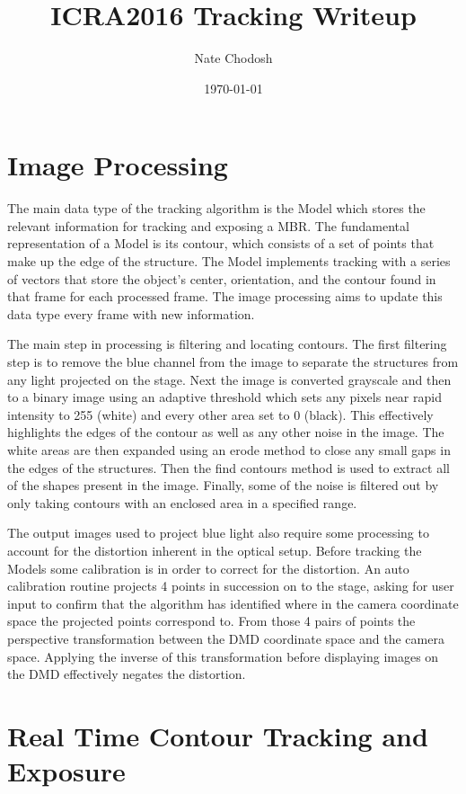 \documentclass[11pt]{article}
\author{Nate Chodosh}
\date{\today}
\title{ICRA2016 Tracking Writeup}
\begin{document}
\maketitle

\section{Image Processing}
\label{sec-1}


The main data type of the tracking algorithm is the Model which stores
the relevant information for tracking and exposing a MBR. The
fundamental representation of a Model is its contour, which consists
of a set of points that make up the edge of the structure. The Model
implements tracking with a series of vectors that store the object's
center, orientation, and the contour found in that frame for each
processed frame. The image processing aims to update this data type
every frame with new information.

The main step in processing is filtering and locating contours. The
first filtering step is to remove the blue channel from the image to
separate the structures from any light projected on the stage. Next
the image is converted grayscale and then to a binary image using an
adaptive threshold which sets any pixels near rapid intensity to 255
(white) and every other area set to 0 (black). This effectively
highlights the edges of the contour as well as any other noise in the
image. The white areas are then expanded using an erode method to
close any small gaps in the edges of the structures. Then the find
contours method is used to extract all of the shapes present in the
image. Finally, some of the noise is filtered out by only taking
contours with an enclosed area in a specified range.

The output images used to project blue light also require some
processing to account for the distortion inherent in the optical
setup.  Before tracking the Models some calibration is in order to
correct for the distortion. An auto calibration routine projects 4
points in succession on to the stage, asking for user input to confirm
that the algorithm has identified where in the camera coordinate space
the projected points correspond to. From those 4 pairs of points the
perspective transformation between the DMD coordinate space and the
camera space. Applying the inverse of this transformation before
displaying images on the DMD effectively negates the distortion.

\section{Real Time Contour Tracking and Exposure}
\label{sec-1-4}
\end{document}

